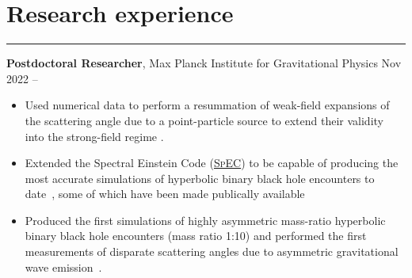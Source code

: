 \documentclass[10.5pt, oneside]{article}   	%
\begin{document}
 
 
\begin{center}
\huge
\href{mailto:oliver.long@aei.mpg.de}{} \:
\textcolor{Orcidcolour}{\href{https://orcid.org/0000-0002-3897-9272}{}} \:
\textcolor{RGcolour}{\href{https://www.researchgate.net/profile/Oliver-Long-3}{}} \:
\textcolor{LIcolour}{\href{https://www.linkedin.com/in/oliverflong/}{}} \:
\href{https://scholar.google.com/citations?user=92pSUO0AAAAJ&hl=en}{} \:
\href{https://oliverlong.info}{}
\end{center}

 \vspace{1mm}


{\color{Sectioncolour}
\section*{Research experience} 
\vspace{-3mm}
\noindent\rule{\linewidth}{0.6pt}}

\textbf{Postdoctoral Researcher}, Max Planck Institute for Gravitational Physics \hfill Nov 2022 --\\ \vspace{-5mm}
\begin{itemize}
\item Used numerical data to perform a resummation of weak-field expansions of the scattering angle due to a point-particle source to extend their validity into the strong-field regime \cite{Long:2024ltn}.
\item Extended the Spectral Einstein Code (\href{https://www.black-holes.org/for-researchers/spec}{\textsc{SpEC}}) to be capable of producing the most accurate simulations of hyperbolic binary black hole encounters to date~\cite{Mendes:2025gov,Long:2025nmj}, some of which have been made publically available~\cite{Scheel:2025jct}
\item Produced the first simulations of highly asymmetric mass-ratio hyperbolic binary black hole encounters (mass ratio 1:10) and performed the first measurements of disparate scattering angles due to asymmetric gravitational wave emission~\cite{Long:2025nmj}.
\end{itemize}
\end{document}
